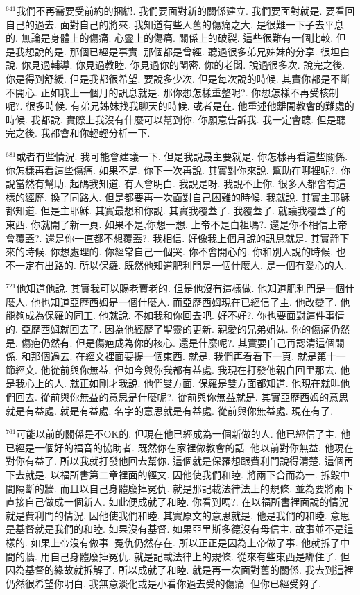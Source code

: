 \documentclass{book}
\begin{document}
$^{641}$我們不再需要受前約的捆綁.
我們要面對新的關係建立.
我們要面對就是.
要看回自己的過去.
面對自己的將來.
我知道有些人舊的傷痛之大.
是很難一下子去平息的.
無論是身體上的傷痛.
心靈上的傷痛.
關係上的破裂.
這些很難有一個比較.
但是我想說的是.
那個已經是事實.
那個都是曾經.
聽過很多弟兄姊妹的分享.
很坦白說.
你見過輔導.
你見過教睦.
你見過你的閨密.
你的老闆.
說過很多次.
說完之後.
你是得到舒緩.
但是我都很希望.
要說多少次.
但是每次說的時候.
其實你都是不斷不開心.
正如我上一個月的訊息就是.
那你想怎樣重整呢?.
你想怎樣不再受核制呢?.
很多時候.
有弟兄姊妹找我聊天的時候.
或者是在.
他重述他離開教會的難處的時候.
我都說.
實際上我沒有什麼可以幫到你.
你願意告訴我.
我一定會聽.
但是聽完之後.
我都會和你輕輕分析一下.

$^{681}$或者有些情況.
我可能會建議一下.
但是我說最主要就是.
你怎樣再看這些關係.
你怎樣再看這些傷痛.
如果不是.
你下一次再說.
其實對你來說.
幫助在哪裡呢?.
你說當然有幫助.
起碼我知道.
有人會明白.
我說是呀.
我說不止你.
很多人都會有這樣的經歷.
換了同路人.
但是都要再一次面對自己困難的時候.
我就說.
其實主耶穌都知道.
但是主耶穌.
其實最想和你說.
其實我覆蓋了.
我覆蓋了.
就讓我覆蓋了的東西.
你就開了新一頁.
如果不是,你想一想.
上帝不是白祖嗎?.
還是你不相信上帝會覆蓋?.
還是你一直都不想覆蓋?.
我相信.
好像我上個月說的訊息就是.
其實靜下來的時候.
你想處理的.
你經常自己一個哭.
你不會開心的.
你和別人說的時候.
也不一定有出路的.
所以保羅.
既然他知道肥利門是一個什麼人.
是一個有愛心的人.

$^{721}$他知道他說.
其實我可以賜老賣老的.
但是他沒有這樣做.
他知道肥利門是一個什麼人.
他也知道亞歷西姆是一個什麼人.
而亞歷西姆現在已經信了主.
他改變了.
他能夠成為保羅的同工.
他就說.
不如我和你回去吧.
好不好?.
你也要面對這件事情的.
亞歷西姆就回去了.
因為他經歷了聖靈的更新.
親愛的兄弟姐妹.
你的傷痛仍然是.
傷疤仍然有.
但是傷疤成為你的核心.
還是什麼呢?.
其實要自己再認清這個關係.
和那個過去.
在經文裡面要提一個東西.
就是.
我們再看看下一頁.
就是第十一節經文.
他從前與你無益.
但如今與你我都有益處.
我現在打發他親自回里那去.
他是我心上的人.
就正如剛才我說.
他們雙方面.
保羅是雙方面都知道.
他現在就叫他們回去.
從前與你無益的意思是什麼呢?.
從前與你無益就是.
其實亞歷西姆的意思就是有益處.
就是有益處.
名字的意思就是有益處.
從前與你無益處.
現在有了.

$^{761}$可能以前的關係是不OK的.
但現在他已經成為一個新做的人.
他已經信了主.
他已經是一個好的福音的協助者.
既然你在家裡做教會的話.
他以前對你無益.
他現在對你有益了.
所以我就打發他回去幫你.
這個就是保羅想跟費利門說得清楚.
這個再下去就是.
以福所書第二章裡面的經文.
因他使我們和睦.
將兩下合而為一.
拆毀中間隔斷的牆.
而且以自己身體廢掉冤仇.
就是那記載法律法上的規條.
並為要將兩下直接自己做成一個新人.
如此便成就了和睦.
你看到嗎?.
在以福所書裡面說的情況就是費利門的情況.
因他使我們和睦.
其實原文的意思就是.
他是我們的和睦.
意思是基督就是我們的和睦.
如果沒有基督.
如果亞里斯多德沒有母信主.
故事並不是這樣的.
如果上帝沒有做事.
冤仇仍然存在.
所以正正是因為上帝做了事.
他就拆了中間的牆.
用自己身體廢掉冤仇.
就是記載法律上的規條.
從來有些東西是綁住了.
但因為基督的緣故就拆解了.
所以成就了和睦.
就是再一次面對舊的關係.
我去到這裡仍然很希望你明白.
我無意淡化或是小看你過去受的傷痛.
但你已經受夠了.
\end{document}
